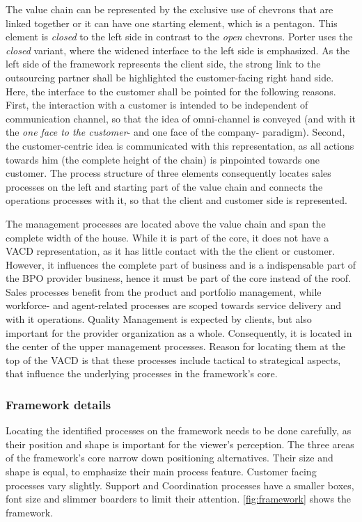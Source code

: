 	
	The value chain can be represented by the exclusive use of chevrons that are linked together or it can have one starting element, which is a pentagon. This element is \textit{closed} to the left side in contrast to the \textit{open} chevrons. Porter uses the \textit{closed} variant, where the widened interface to the left side is emphasized. As the left side of the framework represents the client side, the strong link to the outsourcing partner shall be highlighted \wrt the customer-facing right hand side. Here, the interface to the customer shall be pointed for the following reasons. First, the interaction with a customer is intended to be independent of communication channel, so that the idea of omni-channel is conveyed (and with it the \textit{one face to the customer}- and one face of the company- paradigm). Second, the customer-centric idea is communicated with this representation, as all actions towards him (the complete height of the chain) is pinpointed towards one customer. The process structure of three elements consequently locates sales processes on the left and starting part of the value chain and connects the operations processes with it, so that the client and customer side is represented. 
	
	The management processes are located above the value chain and span the complete width of the house. While it is part of the core, it does not have a \acrshort{VACD} representation, as it has little contact with the the client or customer. However, it influences the complete part of business and is a indispensable part of the \acrshort{BPO} provider business, hence it must be part of the core instead of the roof. Sales processes benefit from the product and portfolio management, while workforce- and agent-related processes are scoped towards service delivery and with it operations. Quality Management is expected by clients, but also important for the provider organization as a whole. Consequently, it is located in the center of the upper management processes. Reason for locating them at the top of the \acrshort{VACD} is that these processes include tactical to strategical aspects, that influence the underlying processes in the framework's core. 
	
	\subsubsection{Framework details}
	
	Locating the identified processes on the framework needs to be done carefully, as their position and shape is important for the viewer's perception. The three areas of the framework's core narrow down positioning alternatives. Their size and shape is equal, to emphasize their main process feature. Customer facing processes vary slightly. Support and Coordination processes have a smaller boxes, font size and slimmer boarders to limit their attention. \Fig \ref{fig:framework} shows the framework.
	

